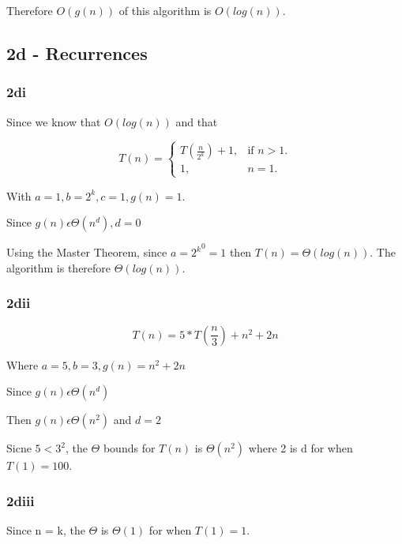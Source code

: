 \documentclass[oneside, a4paper]{article}
\begin{document}
Therefore $O(g(n))$ of this algorithm is $O(log(n))$.

\subsection{2d - Recurrences}

\subsubsection{2di}
Since we know that $O(log(n))$ and that 

\begin{equation}
    T(n)=\begin{cases}
        T(\frac{n}{2^k}) + 1, & \text{if $n>1$}.\\
        1, & \text{$n = 1$}.
    \end{cases}
\end{equation}

With $a = 1, b = 2^k, c = 1, g(n) = 1$. 

Since $g(n) \epsilon \Theta(n^d), d = 0$

Using the Master Theorem, since $a = {2^k}^0 = 1$ then $T(n) = \Theta(log(n))$. The algorithm is therefore $\Theta(log(n))$. 

\subsubsection{2dii}
\begin{center}
    $$T(n) = 5 * T (\frac{n}{3}) + n^2 + 2n$$

    Where $a = 5, b = 3, g(n) = n^2 + 2n$

    Since $g(n) \epsilon \Theta(n^d)$ 

    Then $g(n) \epsilon \Theta(n^2)$ and $d = 2$

    Sicne $5 < 3^2$, the $\Theta$ bounds for $T(n)$ is $\Theta(n^2)$ where 2 is d for when $T(1) = 100$.
\end{center}


\subsubsection{2diii}
Since n = k, the $\Theta$ is  $\Theta(1)$ for when $T(1) = 1$.
\end{document}
